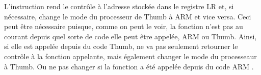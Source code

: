 
L'instruction  rend le contrôle à l'adresse stockée dans le registre \ac{LR}
et, si nécessaire, change le mode du processeur de Thumb à ARM et vice versa.
Ceci peut être nécessaire puisque, comme on peut le voir, la fonction \ttf n'est
pas au courant depuis quel sorte de code elle peut être appelée, ARM ou Thumb.
Ainsi, si elle est appelée depuis du code Thumb,  ne va pas seulement retourner
le contrôle à la fonction appelante, mais également changer le mode du processeaur
à Thumb.
Ou ne pas changer si la fonction a été appelée depuis du code ARM .
